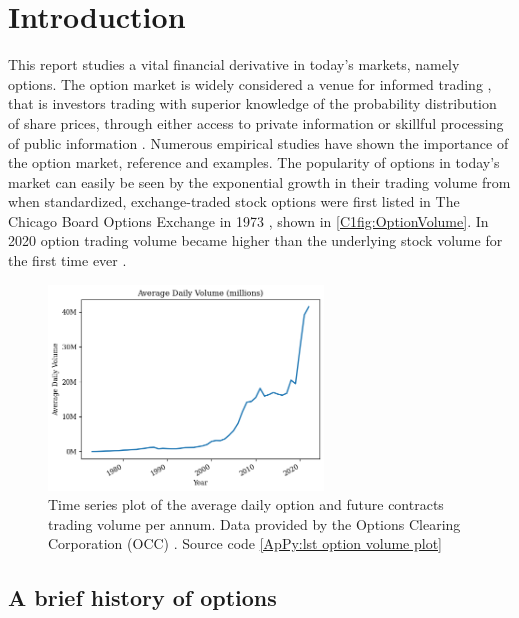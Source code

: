 \chapter{Introduction}

This report studies a vital financial derivative in today's markets, namely options. The option market is widely considered a venue for informed trading \cite{black1975,li2021effect,hu2014,chak2004}, that is investors trading with superior knowledge of the probability distribution of share prices, through either access to private information or skillful processing of public information \cite{grossman1975application}. 
\nline
Numerous empirical studies have shown the importance of the option market, reference and examples. The popularity of options in today's market can easily be seen by the exponential growth in their trading volume from when standardized, exchange-traded stock options were first listed in The Chicago Board Options Exchange in 1973 \cite{markham2002financial}, shown in \autoref{C1fig:OptionVolume}. In 2020 option trading volume became higher than the underlying stock volume for the first time ever \cite{yahooOptions}.

\begin{figure}[H]
    \centering
    \includegraphics[width=0.65\textwidth]{Chapters/C1/plots/OptionVolume.png}
    \caption{Time series plot of the average daily option and future contracts trading volume per annum. Data provided by the Options Clearing Corporation (OCC) \cite{THEOCC}. Source code \autoref{ApPy:lst option volume plot}}
    \label{C1fig:OptionVolume}
\end{figure}

\section{A brief history of options}



